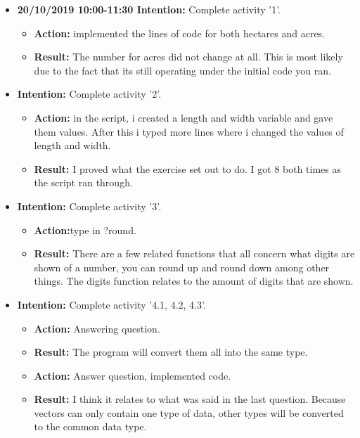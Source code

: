 \documentclass{article}
\begin{document}
\begin{itemize}
\item{\textbf{20/10/2019 10:00-11:30 Intention:} Complete activity '1'.}

\begin{itemize}
\item{\textbf{Action:} implemented the lines of code for both hectares and acres.}
\item{\textbf{Result:} The number for acres did not change at all. This is most likely due to the fact that its still operating under the initial code you ran.}
\end{itemize}

\item{\textbf{Intention:} Complete activity '2'.}

\begin{itemize}
\item{\textbf{Action:} in the script, i created a length and width variable and gave them values. After this i typed more lines where i changed the values of length and width.}
\item{\textbf{Result:} I proved what the exercise set out to do. I got 8 both times as the script ran through.}
\end{itemize}

\item{\textbf{Intention:} Complete activity '3'.}

\begin{itemize}
\item{\textbf{Action:}type in ?round.}
\item{\textbf{Result:} There are a few related functions that all concern what digits are shown of a number, you can round up and round down among other things. The digits function relates to the amount of digits that are shown.}
\end{itemize}

\item{\textbf{Intention:} Complete activity '4.1, 4.2, 4.3'.}

\begin{itemize}
\item{\textbf{Action:} Answering question.}
\item{\textbf{Result:} The program will convert them all into the same type.}

\item{\textbf{Action:} Answer question, implemented code.}
\item{\textbf{Result:} I think it relates to what was said in the last question. Because vectors can only contain one type of data, other types will be converted to the common data type.}


\end{itemize}
\end{itemize}
\end{document}
